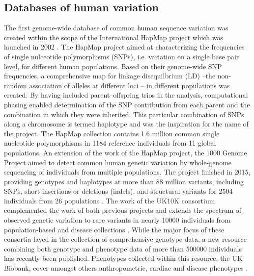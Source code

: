 \subsection{Databases of human variation}
\label{subsection:databases}
The first genome-wide database of common human sequence variation was created within the scope of the International HapMap project which was launched in 2002 \citep{HapMap2005,HapMap2007,HapMap2010}.
The HapMap project aimed at characterizing the frequencies of single nulceotide polymorphisms (SNPs), i.e. variation on a single base pair level, for different human populations. Based on their genome-wide SNP frequencies, a comprehensive map for linkage disequilbrium (LD) --the non-random association of alleles at different loci \citep{Lewontin1960}-- in different populations was created. By having included parent–offspring trios in the analysis, computational phasing \citep{Stephens2001} enabled determination of the SNP contribution from each parent and the combination in which they were inherited. This particular combination of SNPs along a chromosome is termed haplotype and was the inspiration for the name of the project. The HapMap collection contains 1.6 million common single nucleotide polymorphisms in \num{1184} reference individuals from 11 global populations. An extension of the work of the HapMap project, the 1000 Genome Project aimed to detect common human genetic variation by whole-genome sequencing of individuals from multiple populations. The project finished in 2015, providing genotypes and haplotypes at more than 88 million variants, including SNPs, short insertions or deletions (indels), and structural variants for \num{2504} individuals from 26 populations \citep{1000Genomes2011,1000Genomes2012,1000Genomes2015}. The work of the UK10K consortium complemented the work of both previous projects and extends the spectrum of observed genetic variation to rare variants in nearly \num{10000} individuals from population-based and disease collections \citep{UK10KConsortium2015}. While the major focus of these consortia layed in the collection of comprehensive genotype data, a new resource combining both genotype and phenotype data of more than \num{500000} individuals has recently been published. Phenotypes collected within this resource, the UK Biobank, cover amongst others anthropometric, cardiac and disease phenotypes \citep{Sudlow2015}.

